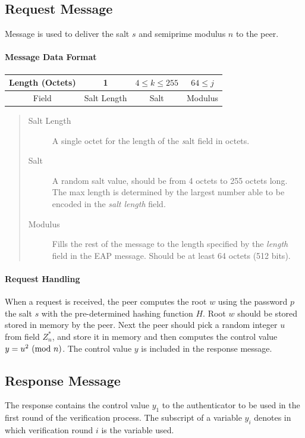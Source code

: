 \subsection*{Request Message} Message is used to deliver the salt $s$ and semiprime modulus $n$ to the peer.

\paragraph{Message Data Format}

\begin{center}
\begin{tabular}{|c|c|c|c|}
	\hline
	Length (Octets) & 1 & $4 \le k \le 255 $ & $64 \le j$\\
	\hline
	Field & Salt Length & Salt & Modulus\\
	\hline
\end{tabular}
\end{center}

\begin{quote}
\begin{description}
	\item[Salt Length] A single octet for the length of the \textit salt field in octets.
	\item[Salt] A random salt value, should be from 4 octets to 255 octets long.
The max length is determined by the largest number able to be encoded in the \textit {salt length} field.
	\item[Modulus] Fills the rest of the message to the length specified by the \textit{length} field in the EAP message. 
Should be at least 64 octets (512 bits).
\end{description}
\end{quote}

\paragraph{Request Handling} When a request is received, the peer computes the root $w$ using the password $p$ the salt $s$ with the pre-determined hashing function $H$.
Root $w$ should be stored stored in memory by the peer. 
Next the peer should pick a random integer $u$ from field $Z^*_n$, and store it in memory and then computes the control value $y = u^2 \ (\mathrm{mod}\ n)$.
The control value $y$ is included in the response message.

\subsection*{Response Message}
The response contains the control value $y_1$ to the authenticator to be used in the first round of the verification process.
The subscript of a variable $y_i$ denotes in which verification round $i$ is the variable used.


